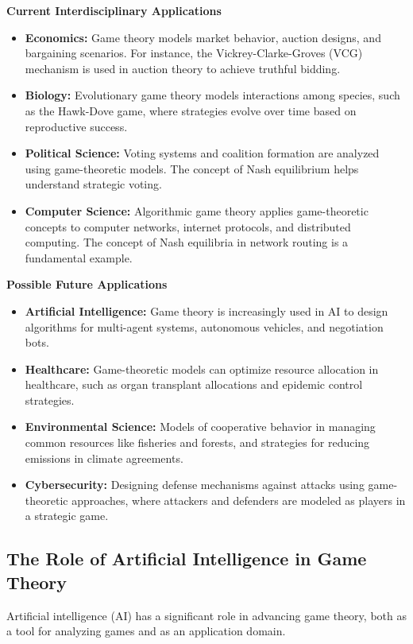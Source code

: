 \documentclass[12pt]{book} %
\begin{document}
\textbf{Current Interdisciplinary Applications}
\begin{itemize}
    \item \textbf{Economics:} Game theory models market behavior, auction designs, and bargaining scenarios. For instance, the Vickrey-Clarke-Groves (VCG) mechanism is used in auction theory to achieve truthful bidding.
    \item \textbf{Biology:} Evolutionary game theory models interactions among species, such as the Hawk-Dove game, where strategies evolve over time based on reproductive success.
    \item \textbf{Political Science:} Voting systems and coalition formation are analyzed using game-theoretic models. The concept of Nash equilibrium helps understand strategic voting.
    \item \textbf{Computer Science:} Algorithmic game theory applies game-theoretic concepts to computer networks, internet protocols, and distributed computing. The concept of Nash equilibria in network routing is a fundamental example.
\end{itemize}

\textbf{Possible Future Applications}
\begin{itemize}
    \item \textbf{Artificial Intelligence:} Game theory is increasingly used in AI to design algorithms for multi-agent systems, autonomous vehicles, and negotiation bots.
    \item \textbf{Healthcare:} Game-theoretic models can optimize resource allocation in healthcare, such as organ transplant allocations and epidemic control strategies.
    \item \textbf{Environmental Science:} Models of cooperative behavior in managing common resources like fisheries and forests, and strategies for reducing emissions in climate agreements.
    \item \textbf{Cybersecurity:} Designing defense mechanisms against attacks using game-theoretic approaches, where attackers and defenders are modeled as players in a strategic game.
\end{itemize}

\subsection{The Role of Artificial Intelligence in Game Theory}
Artificial intelligence (AI) has a significant role in advancing game theory, both as a tool for analyzing games and as an application domain.
\end{document}
